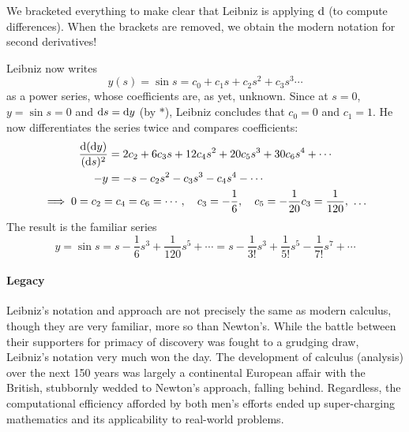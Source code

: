 We bracketed everything to make clear that Leibniz is applying $\mathrm{d}$ (to compute differences). When the brackets are removed, we obtain the modern notation for second derivatives!

Leibniz now writes
\[
	y(s)=\sin s=c_0+c_1s+c_2s^2+c_3s^3\cdots
\]
as a power series, whose coefficients are, as yet, unknown. Since at $s=0$, $y=\sin s=0$ and ${\mathrm{d} s}={\mathrm{d} y}$ (by $\ast$), Leibniz concludes that $c_0=0$ and $c_1=1$. He now differentiates the series twice and compares coefficients:
\begin{gather*}
	\begin{aligned}
	\frac{\mathrm{d}({\mathrm{d} y})}{({\mathrm{d} s})^2} &=2c_2+6c_3s+12c_4s^2+20c_5s^3+30c_6s^4+\cdots \\
	-y&=-s-c_2s^2-c_3s^3-c_4s^4-\cdots\\
	\end{aligned}\\
	\implies 0=c_2=c_4=c_6=\cdots,\quad 
	c_3=-\frac 16,\quad c_5=-\frac 1{20}c_3=\frac 1{120},\ \ldots 
\end{gather*}
The result is the familiar series
\[
	y=\sin s=s-\frac 16s^3+\frac 1{120}s^5+\cdots =s-\frac 1{3!}s^3+\frac 1{5!}s^5-\frac 1{7!}s^7+ \cdots
\]


\paragraph{Legacy}

Leibniz's notation and approach are not precisely the same as modern calculus, though they are very familiar, more so than Newton's. While the battle between their supporters for primacy of discovery was fought to a grudging draw, Leibniz's notation very much won the day. The development of calculus (analysis) over the next 150 years was largely a continental European affair with the British, stubbornly wedded to Newton's approach, falling behind. Regardless, the computational efficiency afforded by both men's efforts ended up super-charging mathematics and its applicability to real-world problems.


